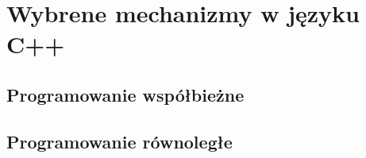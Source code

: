 \chapter{Wybrene mechanizmy w języku C++}
\section{Programowanie współbieżne}
\section{Programowanie równoległe}

